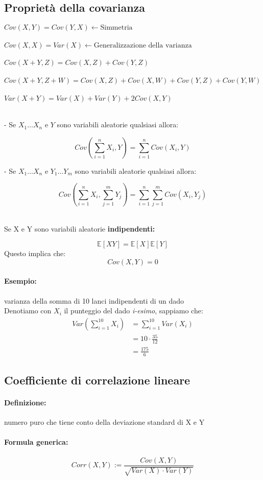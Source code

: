 \documentclass[]{article}
\newcommand{\ev}{\mathbb{E}[X]}
\renewcommand{\ev}[1]{\mathbb{E}[#1]}
\newcommand{\definizione}{\paragraph{Definizione:}}
\newcommand{\formula}{\paragraph{Formula generica:}}
\begin{document}
    \subsection{Proprietà della covarianza}
    $ Cov(X, Y) = Cov(Y, X) \longleftarrow \text{Simmetria} $ \\ \\
    $ Cov(X, X) = Var(X) \longleftarrow \text{Generalizzazione della varianza} $ \\ \\
    $ Cov(X+Y, Z) = Cov(X, Z) + Cov(Y, Z) $ \\ \\
    $ Cov(X+Y, Z+W) = Cov(X, Z) + Cov(X, W) + Cov(Y, Z) + Cov(Y, W) $ \\ \\
    $ Var(X + Y) = Var(X) + Var(Y) + 2 Cov(X, Y) $ \\ \\
    \centerline{- Se $X_1 \ldots X_n$ e $Y $ sono variabili aleatorie qualsiasi allora:}
    \[ Cov(\sum_{i = 1}^{n}X_i, Y) = \sum_{i = 1}^{n} Cov(X_i, Y) \]
    \centerline{- Se $X_1 \ldots X_n$ e $Y_1 \ldots Y_m$ sono variabili aleatorie qualsiasi allora:}
    \[ Cov(\sum_{i = 1}^{n}X_i, \sum_{j = 1}^{m} Y_j) = \sum_{i = 1}^{n} \sum_{j = 1}^{m} Cov(X_i, Y_j) \] \\
    \linebreak[2]
    \centerline{Se X e Y sono variabili aleatorie \textbf{indipendenti:}}
    \[ \ev{XY} = \ev{X} \ev{Y} \]
    Questo implica che:
    \[ Cov(X, Y) = 0 \]

    \paragraph{Esempio:} varianza della somma di 10 lanci indipendenti di un dado \\
    Denotiamo con \textbf{$X_i$} il punteggio del dado \textit{i-esimo}, sappiamo che:
    \begin{equation*}
        \begin{split}
            Var(\sum_{i = 1}^{10} X_i) &= \sum_{i = 1}^{10} Var(X_i) \\
            & = 10 \cdot \frac{35}{12} \\
            & = \frac{175}{6}
        \end{split}
    \end{equation*}
    
    \subsection{Coefficiente di correlazione lineare}
    \definizione numero puro che tiene conto della deviazione standard di X e Y
    \formula
    \begin{equation*}
        Corr(X,Y) := \frac{Cov(X,Y)}{\sqrt{Var(X) \cdot Var(Y)}}
    \end{equation*}
\end{document}
